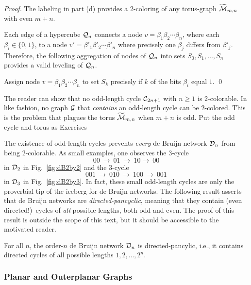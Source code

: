 \begin{proof}
The labeling in part (d) provides a $2$-coloring of any torus-graph
$\widetilde{\mbox{$\cal M$}}_{m,n}$ with even $m+n$.

\medskip

Each edge of a hypercube $\mbox{$\cal Q$}_n$ connects a node $v = \beta_1 \beta_2
\cdots \beta_n$, where each $\beta_i \in \{0,1\}$, to a node $v' =
\beta'_1 \beta'_2 \cdots \beta'_n$ where precisely one $\beta_j$
differs from $\beta'_j$.  Therefore, the following aggregation of
nodes of $\mbox{$\cal Q$}_n$ into sets $S_0, S_1, \ldots, S_n$ provides a valid
leveling of $\mbox{$\cal Q$}_n$.

Assign node $v = \beta_1 \beta_2 \cdots \beta_n$ to set $S_k$
precisely if $k$ of the bits $\beta_i$ equal $1$.
\qed
\end{proof}

The reader can show that no odd-length cycle $\mbox{$\cal C$}_{2n+1}$ with $n \geq
1$ is $2$-colorable.  In like fashion, no graph $\mbox{$\cal G$}$ that {\em
  contains} an odd-length cycle can be $2$-colored.  This is the
problem that plagues the torus $\widetilde{\mbox{$\cal M$}}_{m,n}$ when $m+n$ is
odd.
  {\Arny Put the odd cycle and torus as Exercises}

The existence of odd-length cycles prevents {\em every} de Bruijn
network $\mbox{$\cal D$}_n$ from being $2$-colorable.  As small examples, one
observes the $3$-cycle
\[ 00 \ \rightarrow \ 01 \ \rightarrow \ 10  \rightarrow \ 00 \]
in $\mbox{$\cal D$}_2$ in Fig.~\ref{fig:dB2by2} and the $3$-cycle
\[ 001 \ \rightarrow \ 010 \ \rightarrow \ 100 \ \rightarrow \ 001 \]
in $\mbox{$\cal D$}_3$ in Fig.~\ref{fig:dB2by3}.  In fact, these small odd-length
cycles are only the proverbial tip of the iceberg for de Bruijn
networks.  The following result asserts that de Bruijn networks are
{\it directed-pancyclic},  
 
meaning that they contain (even directed!)~cycles of {\em all}
possible lengths, both odd and even.  The proof of this result is
outside the scope of this text, but it should be accessible to the
motivated reader.

\begin{prop}{\cite{Yoeli62}}
For all $n$, the order-$n$ de Bruijn
network $\mbox{$\cal D$}_n$ is directed-pancylic, i.e., it
contains directed cycles of all possible lengths $1, 2, \ldots, 2^n$.
\end{prop}

\subsubsection{Planar and Outerplanar Graphs}
\label{sec:planar+outerplanar-color}

